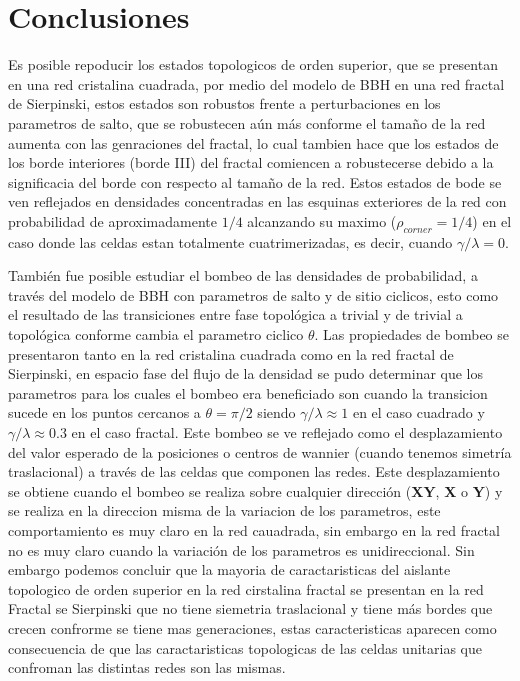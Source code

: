 \chapter{Conclusiones}  %


Es posible repoducir los estados topologicos de orden superior, que se presentan en una red cristalina cuadrada,  por medio del modelo de BBH en una red fractal de Sierpinski, estos estados son robustos frente a perturbaciones en los parametros de salto, que se robustecen aún más conforme el tamaño de la red aumenta con las genraciones del fractal, lo cual tambien hace que los estados de los borde interiores (borde III) del fractal comiencen a robustecerse debido a la significacia del borde con respecto al tamaño de la red. Estos estados de bode se ven reflejados en densidades concentradas en las esquinas exteriores de la red con probabilidad de aproximadamente $1/4$ alcanzando su maximo ($\rho_{corner} = 1/4 $) en el caso donde las celdas estan totalmente cuatrimerizadas, es decir, cuando $\gamma/\lambda = 0$.

También fue posible estudiar el bombeo de las densidades de probabilidad, a través del modelo de BBH con parametros de salto y de sitio ciclicos, esto como el resultado de las transiciones entre fase topológica a trivial y de trivial a topológica conforme cambia el parametro ciclico $\theta$. Las propiedades de bombeo se presentaron tanto en la red cristalina cuadrada como en la red fractal de Sierpinski, en espacio fase del flujo de la densidad se pudo determinar que los parametros para los cuales el bombeo era beneficiado son cuando la transicion sucede en los puntos cercanos a $\theta =  \pi/2$ siendo $\gamma/\lambda \approx 1$ en el caso cuadrado y $\gamma/\lambda \approx 0.3$ en el caso fractal. Este bombeo se ve reflejado como el desplazamiento del valor esperado de la posiciones o centros de wannier (cuando tenemos simetría traslacional) a través de las celdas que componen las redes. Este desplazamiento se obtiene cuando el bombeo se realiza sobre cualquier dirección (\textbf{XY}, \textbf{X} o \textbf{Y}) y se realiza en la direccion misma de la variacion de los parametros, este comportamiento es muy claro en la red cauadrada, sin embargo en la red fractal no es muy claro cuando la variación de los parametros es unidireccional. Sin embargo podemos concluir que la mayoria de caractaristicas del aislante topologico de orden superior en la red cirstalina fractal se presentan en la red Fractal se Sierpinski que no tiene siemetria traslacional y tiene más bordes que crecen confrorme se tiene mas generaciones, estas caracteristicas aparecen como consecuencia de que las caractaristicas topologicas de las celdas unitarias que confroman las distintas redes son las mismas. 


\clearpage %